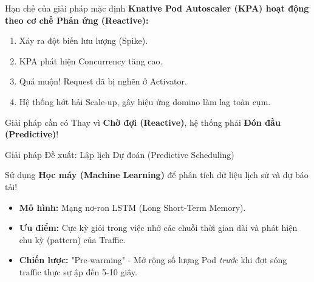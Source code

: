 \documentclass[10pt, aspectratio=169]{beamer}
\begin{document}
\begin{frame}{Hạn chế của giải pháp mặc định}
    \textbf{Knative Pod Autoscaler (KPA) hoạt động theo cơ chế Phản ứng (Reactive):}
    \vspace{0.5cm}
    \begin{enumerate}
        \item Xảy ra đột biến lưu lượng (Spike). \pause
        \item KPA phát hiện Concurrency tăng cao. \pause
        \item \alert{Quá muộn!} Request đã bị nghẽn ở Activator. \pause
        \item Hệ thống hớt hải Scale-up, gây hiệu ứng domino làm lag toàn cụm.
    \end{enumerate}
    \vspace{0.5cm}
    \pause
    \begin{alertblock}{Giải pháp cần có}
        Thay vì \textbf{Chờ đợi (Reactive)}, hệ thống phải \textbf{Đón đầu (Predictive)}!
    \end{alertblock}
\end{frame}

\begin{frame}{Giải pháp Đề xuất: Lập lịch Dự đoán (Predictive Scheduling)}
    \begin{center}
        \Large Sử dụng \textbf{Học máy (Machine Learning)} để phân tích dữ liệu lịch sử và dự báo tải!
    \end{center}
    \vspace{0.5cm}
    \begin{itemize}
        \item \textbf{Mô hình:} Mạng nơ-ron LSTM (Long Short-Term Memory). \pause
        \item \textbf{Ưu điểm:} Cực kỳ giỏi trong việc nhớ các chuỗi thời gian dài và phát hiện chu kỳ (pattern) của Traffic. \pause
        \item \textbf{Chiến lược:} "Pre-warming" - Mở rộng số lượng Pod \textit{trước} khi đợt sóng traffic thực sự ập đến 5-10 giây.
    \end{itemize}
\end{frame}
\end{document}
